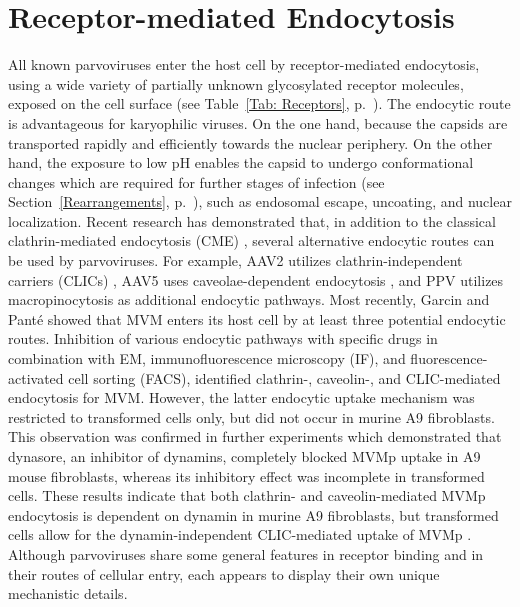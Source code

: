 \section{Receptor-mediated Endocytosis}
\label{Endocytosis}
All known parvoviruses enter the host cell by receptor-mediated endocytosis, using a wide variety of partially unknown glycosylated receptor molecules, exposed on the cell surface \cite{pmid18406140} (see Table~\ref{Tab: Receptors}, p.~\pageref{Tab: Receptors}). The endocytic route is advantageous for karyophilic viruses. On the one hand, because the capsids are transported rapidly and efficiently towards the nuclear periphery. On the other hand, the exposure to low pH enables the capsid to undergo conformational changes which are required for further stages of infection (see Section~\ref{Rearrangements}, p.~\pageref{Rearrangements}), such as endosomal escape, uncoating, and nuclear localization. Recent research has demonstrated that, in addition to the classical clathrin-mediated endocytosis (CME) \cite{pmid20484503, pmid10559355, pmid10644365}, several alternative endocytic routes can be used by parvoviruses. For example, AAV2 utilizes clathrin-independent carriers (CLICs) \cite{pmid22177561}, AAV5 uses caveolae-dependent endocytosis \cite{pmid19141440}, and PPV utilizes macropinocytosis \cite{pmid20484503} as additional endocytic pathways. Most recently, Garcin and Panté showed that MVM enters its host cell by at least three potential endocytic routes. Inhibition of various endocytic pathways with specific drugs in combination with EM, immunofluorescence microscopy (IF), and fluorescence-activated cell sorting (FACS), identified clathrin-, caveolin-, and CLIC-mediated endocytosis for MVM. However, the latter endocytic uptake mechanism was restricted to transformed cells only, but did not occur in murine A9 fibroblasts. This observation was confirmed in further experiments which demonstrated that dynasore, an inhibitor of dynamins, completely blocked MVMp uptake in A9 mouse fibroblasts, whereas its inhibitory effect was incomplete in transformed cells. These results indicate that both clathrin- and caveolin-mediated MVMp endocytosis is dependent on dynamin in murine A9 fibroblasts, but transformed cells allow for the dynamin-independent CLIC-mediated uptake of MVMp \cite{pmid25863880}. Although parvoviruses share some general features in receptor binding and in their routes of cellular entry, each appears to display their own unique mechanistic details.     

